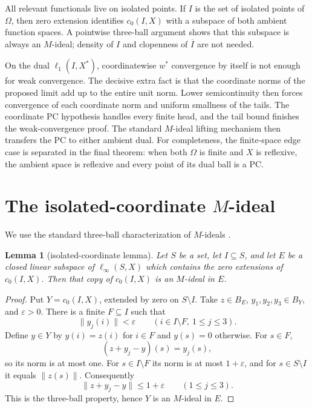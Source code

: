\documentclass[11pt]{article}
\newtheorem{lemma}[theorem]{Lemma}
\begin{document}
All relevant functionals live on isolated points.  If $I$ is the set of
isolated points of $\Omega$, then zero extension identifies $c_0(I,X)$ with a
subspace of both ambient function spaces.  A pointwise three-ball argument
shows that this subspace is always an $M$-ideal; density of $I$ and clopenness
of $\overline I$ are not needed.

On the dual $\ell_1(I,X^*)$, coordinatewise $w^*$ convergence by itself is not
enough for weak convergence.  The decisive extra fact is that the coordinate
norms of the proposed limit add up to the entire unit norm.  Lower
semicontinuity then forces convergence of each coordinate norm and uniform
smallness of the tails.  The coordinate PC hypothesis handles every finite
head, and the tail bound finishes the weak-convergence proof.  The standard
$M$-ideal lifting mechanism then transfers the PC to either ambient dual.
For completeness, the finite-space edge case is separated in the final
theorem: when both $\Omega$ is finite and $X$ is reflexive, the ambient space
is reflexive and every point of its dual ball is a PC.

\section*{The isolated-coordinate $M$-ideal}

We use the standard three-ball characterization of $M$-ideals
\cite[Chapter I]{hww}.

\begin{lemma}[isolated-coordinate lemma]\label{lem:mideal}
Let $S$ be a set, let $I\subseteq S$, and let $E$ be a closed linear subspace
of $\ell_\infty(S,X)$ which contains the zero extensions of $c_0(I,X)$.  Then
that copy of $c_0(I,X)$ is an $M$-ideal in $E$.
\end{lemma}

\begin{proof}
Put $Y=c_0(I,X)$, extended by zero on $S\setminus I$.  Take
$z\in B_E$, $y_1,y_2,y_3\in B_Y$, and $\varepsilon>0$.  There is a finite
$F\subseteq I$ such that
\[
  \lVert y_j(i)\rVert<\varepsilon
  \qquad(i\in I\setminus F,\ 1\leq j\leq 3).
\]
Define $y\in Y$ by $y(i)=z(i)$ for $i\in F$ and $y(s)=0$ otherwise.  For
$s\in F$,
\[
  (z+y_j-y)(s)=y_j(s),
\]
so its norm is at most one.  For $s\in I\setminus F$ its norm is at most
$1+\varepsilon$, and for $s\in S\setminus I$ it equals $\lVert z(s)\rVert$.
Consequently
\[
  \lVert z+y_j-y\rVert\leq 1+\varepsilon
  \qquad(1\leq j\leq3).
\]
This is the three-ball property, hence $Y$ is an $M$-ideal in $E$.
\end{proof}
\end{document}
